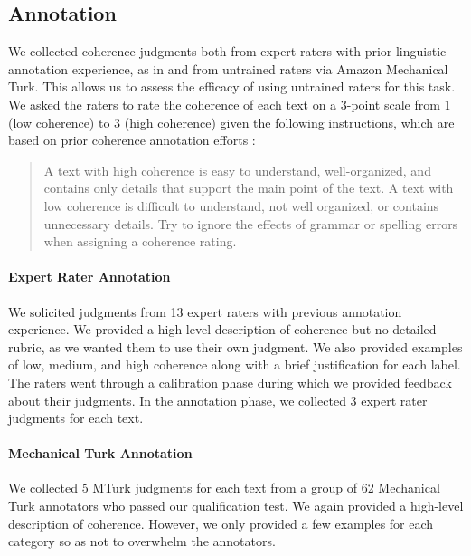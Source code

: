 \documentclass[11pt,a4paper]{article}
\begin{document}
\subsection{Annotation}
\label{sec:annotation}
We collected coherence judgments both from expert raters with prior linguistic annotation experience, as in \citet{burstein:2010:naacl} and from untrained raters via Amazon Mechanical Turk.  This allows us to assess the efficacy of using untrained raters for this task.   We asked the raters to rate the coherence of each text on a 3-point scale from 1 (low coherence) to 3 (high coherence) given the following instructions, which are based on prior coherence annotation efforts \cite{barzilay_CL_2008,BursteinTC13}:
\vspace{-5pt}
\begin{quote}
A text with high coherence is easy to understand, well-organized, and contains only details that support the main point of the text. A text with low coherence is difficult to understand, not well organized, or contains unnecessary details. Try to ignore the effects of grammar or spelling errors when assigning a coherence rating.	
\end{quote}

\paragraph{Expert Rater Annotation} We solicited judgments from 13 expert raters with previous annotation experience. We provided a high-level description of coherence but no detailed rubric, as we wanted them to use their own judgment. We also provided examples of low, medium, and high coherence along with a brief justification for each label.
The raters went through a calibration phase during which we provided feedback about their judgments. In the annotation phase, we collected 3 expert rater judgments for each text.






\paragraph{Mechanical Turk Annotation} We collected 5 MTurk judgments for each text from a group of 62 Mechanical Turk annotators who passed our qualification test. We again provided a high-level description of coherence. However, we only provided a few examples for each category so as not to overwhelm the annotators.
\end{document}
